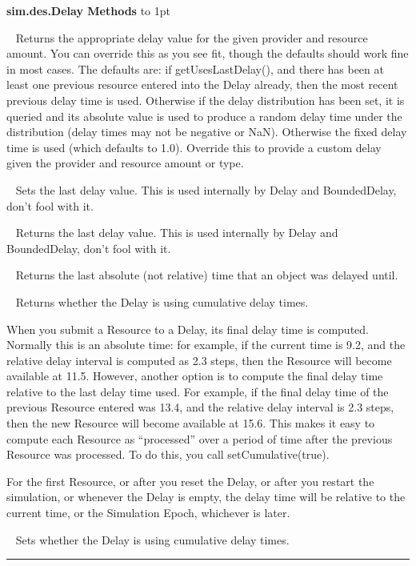 \documentclass[twoside,10pt]{article}
\newcommand\class[1]{\index{Classes!{#1}}\textsf{#1}}
\newcommand\method[1]{\hbox{\textsf{#1}}}
\newcommand*{\xfill}[1][0pt]{%
	\cleaders
		\hbox to 1pt{\hss
			\raisebox{#1}{\rule{1.2pt}{0.4pt}}%
			\hss}\hfill}
\newenvironment{methods}[1]{
\vspace{1.0em}\noindent\textsf{\textbf{#1 Methods}}\quad \xfill[0.5ex]
\vspace{-0.25em}
\begin{description}
\small}
{\end{description}\hrule\vspace{1.5em}}
\newcommand{\mthd}[1]{\item[{\sf #1}]~\newline}
\begin{document}
\begin{methods}{\class{sim.des.Delay}}
\mthd{protected double getDelay(Provider provider, Resource amount)}
Returns the appropriate delay value for the given provider and resource amount.
    	You can override this as you see fit, though the defaults should work fine in most 
    	cases.  The defaults are: if getUsesLastDelay(), and there has been at least one 
    	previous resource entered into the Delay already, then the most recent previous 
    	delay time is used.  Otherwise if the delay distribution has been set, it is queried
    	and its absolute value is used to produce a random delay time under the distribution
    	(delay times may not be negative or NaN).  Otherwise the fixed delay time is used 
    	(which defaults to 1.0).  Override this to provide a custom delay given the 
        provider and resource amount or type.
        
\mthd{protected void setLastDelay(double val)}
Sets the last delay value.  This is used internally by Delay and BoundedDelay, don't fool with it.

\mthd{protected double getLastDelay()}
Returns the last delay value.  This is used internally by Delay and BoundedDelay, don't fool with it.

\mthd{public double getLastDelayTime()}
Returns the last absolute (not relative) time that an object was delayed until.

\mthd{public boolean isCumulative()}
Returns whether the Delay is using cumulative delay times.

When you submit a Resource to a Delay, its final delay time is computed.  Normally this is an absolute time: for example, if the current time is 9.2, and the relative delay interval is computed as 2.3 steps, then the Resource will become available at 11.5.  However, another option is to compute the final delay time relative to the last delay time used.   For example, if the final delay time of the previous Resource entered was 13.4, and the relative delay interval is 2.3 steps, then the new Resource will become available at 15.6.  This makes it easy to compute each Resource as ``processed'' over a period of time after the previous Resource was processed.  To do this, you call \method{setCumulative(true)}.  

For the first Resource, or after you reset the Delay, or after you restart
	the simulation, or whenever the Delay is empty, the delay time will be relative to the current time, or the
	Simulation Epoch, whichever is later.

\mthd{public void setCumulative(boolean val)}
Sets whether the Delay is using cumulative delay times.


\end{methods}
\end{document}
